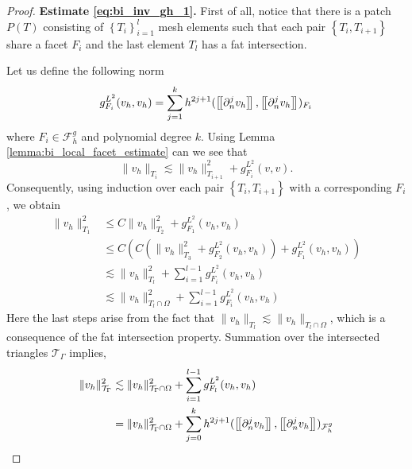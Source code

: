 \begin{proof}
        \textbf{Estimate \eqref{eq:bi_inv_gh_1}.}
            First of all, notice that there is a patch $P(T) $ consisting of $\left\{ T_{i} \right\}_{i=1}^{l} $ mesh elements such that each pair $ \left\{ T_{i}, T_{i+1} \right\} $ share a facet $F_{i}$ and the last element $T_{l}$ has a fat intersection.

            Let us define the following norm
            \begin{equation}
            g_{F_{i}}^{L^{2}}( v_{h},v_{h})  = \sum_{j=1}^{k} h^{2j+1}( \left[\!\left[  \partial ^{j}_{n}v_{h}  \right]\!\right], \left[\!\left[  \partial ^{j}_{n}v_{h}  \right]\!\right]    )_{F_{i} }
            \end{equation}
            where $F_{i} \in  \mathcal{F} ^{g}_{h}$ and polynomial degree $ k$. Using Lemma \ref{lemma:bi_local_facet_estimate} can we see that
            \begin{equation}
            \| v_{h} \|_{ T_{i} }^{  } \lesssim \| v_{h} \|_{ T_{i+1} }^{ 2 } + g_{F_{i}}^{L^{2}}( v,v).
            \end{equation}
    Consequently, using induction over each pair $\left\{ T_{i}, T_{i+1} \right\} $ with a corresponding $F_{i}$, we obtain
    \begin{align}
            \| v_{h} \|_{ T_{1} }^{2  }  & \le  C \| v_{h} \|_{ T_{2} }^{ 2 } + g_{F_{1}}^{L^{2}}( v_{h},v_{h})\\
              & \le  C( C( \| v_{h} \|_{ T_{3} }^{ 2 } + g_{F_{2}}^{L^{2}}( v_{h},v_{h}) ) + g_{F_{1}}^{L^{2}}( v_{h},v_{h}) )\\
              & \lesssim    \| v_{h} \|_{ T_{l} }^{ 2 }  + \sum_{i=1}^{l-1} g_{F_{i}}^{L^{2}}( v_{h},v_{h})  \\
              & \lesssim    \| v_{h} \|_{ T_{l} \cap \Omega  }^{ 2 }  + \sum_{i=1}^{l-1} g_{F_{i}}^{L^{2}}( v_{h},v_{h})
    \end{align}
            Here the last steps arise from the fact that $\|  v_{h} \|_{ T_{l} }^{  } \lesssim  \|  v_{h} \|_{ T_{l} \cap \Omega  }^{  }  $, which is a consequence of the fat intersection property.
            Summation over the intersected triangles $\mathcal{T} _{\Gamma }$ implies,
            \begin{align}
                    \| v_{h} \|_{ \mathcal{T} _{\Gamma } }^{2  } & \lesssim \| v_{h} \|_{ \mathcal{T} _{\Gamma}\cap \Omega  }^{2  }+ \sum_{i=1}^{l-1} g_{F_{l}}^{L^{2}}( v_{h},v_{h}) \\
                                                                 & = \| v_{h} \|_{ \mathcal{T}_{\Gamma } \cap \Omega   }^{ 2 }  + \sum_{j=0}^{k} h^{2j+1} ( \jump{ \partial ^{j}_{n} v_{h} }, \jump{ \partial ^{j}_{n}v_{h} }    )_{\mathcal{F}_{h}^{g}}

\end{align}
\end{proof}
